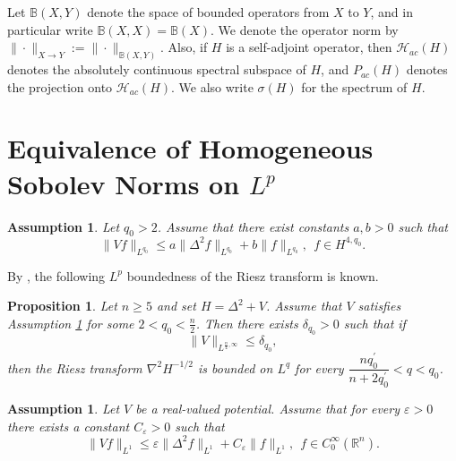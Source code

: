\documentclass[11pt,a4paper]{article}
\numberwithin{equation}{section}
\newtheorem{proposition}[theorem]{Proposition}
\newtheorem{assumption}[theorem]{Assumption}
\begin{document}
Let $\mathbb{B}(X, Y)$ denote the space of bounded operators from $X$ to $Y$, and in particular write $\mathbb{B}(X, X) = \mathbb{B}(X)$. We denote the operator norm by $\|\cdot\|_{X \rightarrow Y} := \|\cdot\|_{\mathbb{B}(X, Y)}$. Also, if $H$ is a self-adjoint operator, then $\mathcal{H}_{ac}(H)$ denotes the absolutely continuous spectral subspace of $H$, and $P_{ac}(H)$ denotes the projection onto $\mathcal{H}_{ac}(H)$. We also write $\sigma(H)$ for the spectrum of $H$.

\section{Equivalence of Homogeneous Sobolev Norms on $L^{p}$}

\begin{assumption}\label{as:sobolev}
Let $q_{0} > 2$. Assume that there exist constants $a, b > 0$ such that
\[\|Vf\|_{L^{q_{0}}} \leq a\|\Delta^{2}f\|_{L^{q_{0}}} + b\|f\|_{L^{q_{0}}},\ \ f \in H^{4, q_{0}}. \]
\end{assumption}

By \cite{Deng-2}, the following $L^{p}$ boundedness of the Riesz transform is known.
\begin{proposition}\label{riesz}
Let $n \geq 5$ and set $H = \Delta^{2} + V$. Assume that $V$ satisfies Assumption \ref{as:sobolev} for some $2 < q_{0} < \frac{n}{2}$. Then there exists $\delta_{q_{0}} > 0$ such that if
\begin{equation}
\|V\|_{L^{\frac{n}{4}, \infty}} \leq \delta_{q_{0}},
\end{equation}
then the Riesz transform $\nabla^{2}H^{-1/2}$ is bounded on $L^{q}$ for every $\dfrac{nq_{0}^{\prime}}{n + 2q_{0}^{\prime}} < q < q_{0}$.
\end{proposition}

\begin{assumption}\label{as:kernel}
Let $V$ be a real-valued potential. Assume that for every $\varepsilon > 0$ there exists a constant $C_{\varepsilon} > 0$ such that
\[ \|Vf\|_{L^{1}} \leq \varepsilon \|\Delta^{2}f\|_{L^{1}} + C_{\varepsilon}\|f\|_{L^{1}}, \ \ f \in C_{0}^{\infty}(\mathbb{R}^{n}).\]
\end{assumption}
\end{document}
